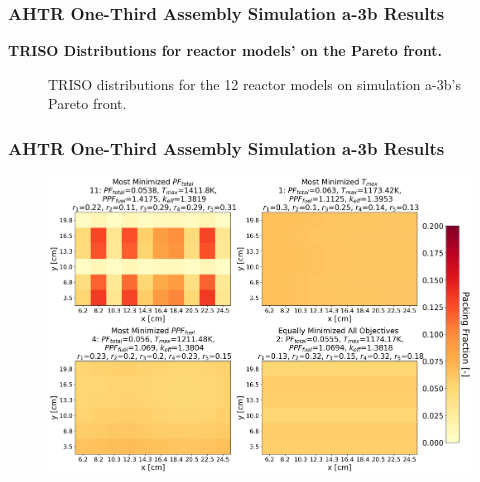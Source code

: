 \begin{frame}
    \frametitle{AHTR One-Third Assembly Simulation a-3b Results}
    \textbf{TRISO Distributions for reactor models' on the Pareto front.}

    \vspace{0.2cm}
    \begin{figure}
        \caption{TRISO distributions for the 12 reactor models on simulation 
        a-3b's Pareto front.}
    \end{figure}
\end{frame}

\begin{frame}
    \frametitle{AHTR One-Third Assembly Simulation a-3b Results}
    \begin{figure}
        \includegraphics[width=0.8\linewidth]{../docs/figures/assem-obj-3-all-distr-most-minimized.png} 
    \end{figure}
\end{frame}

